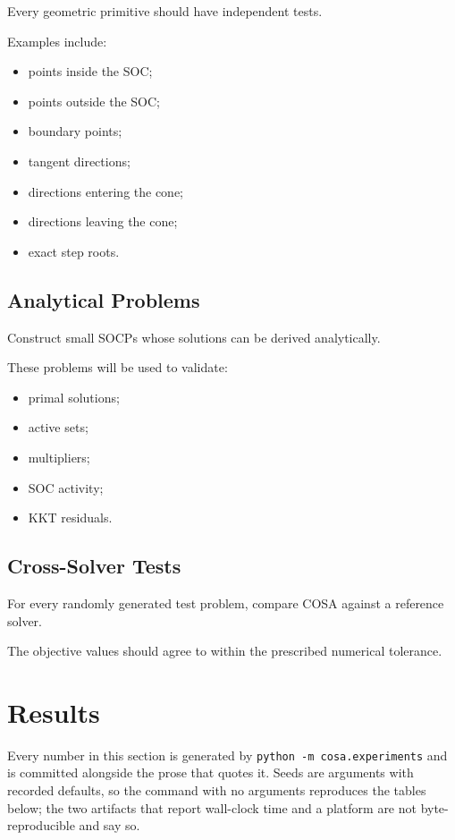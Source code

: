 \documentclass[11pt,a4paper]{article}
\begin{document}
Every geometric primitive should have independent tests.

Examples include:

\begin{itemize}
    \item points inside the SOC;
    \item points outside the SOC;
    \item boundary points;
    \item tangent directions;
    \item directions entering the cone;
    \item directions leaving the cone;
    \item exact step roots.
\end{itemize}

\subsection{Analytical Problems}

Construct small SOCPs whose solutions can be derived analytically.

These problems will be used to validate:

\begin{itemize}
    \item primal solutions;
    \item active sets;
    \item multipliers;
    \item SOC activity;
    \item KKT residuals.
\end{itemize}

\subsection{Cross-Solver Tests}

For every randomly generated test problem, compare COSA against a
reference solver.

The objective values should agree to within the prescribed numerical
tolerance.

\section{Results}

Every number in this section is generated by
\verb|python -m cosa.experiments| and is committed alongside the
prose that quotes it. Seeds are arguments with recorded defaults, so
the command with no arguments reproduces the tables below; the two
artifacts that report wall-clock time and a platform are not
byte-reproducible and say so.
\end{document}
